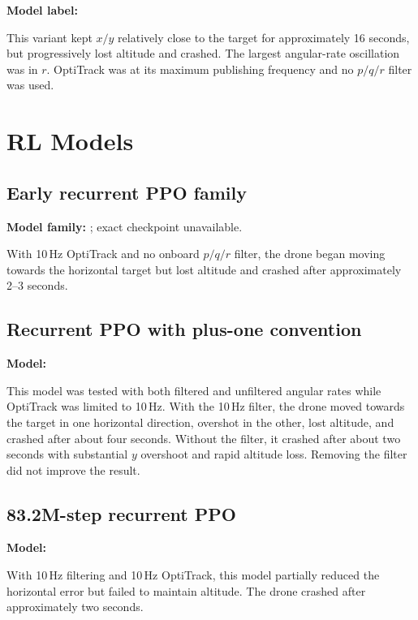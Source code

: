 \documentclass[11pt,a4paper]{article}
\begin{document}
\textbf{Model label:} 

This variant kept $x/y$ relatively close to the target for approximately 16 seconds, but progressively lost altitude and crashed. The largest angular-rate oscillation was in $r$. OptiTrack was at its maximum publishing frequency and no $p/q/r$ filter was used.

\section{RL Models}

\subsection{Early recurrent PPO family}

\textbf{Model family:} ; exact checkpoint unavailable.

With 10\,Hz OptiTrack and no onboard $p/q/r$ filter, the drone began moving towards the horizontal target but lost altitude and crashed after approximately 2--3 seconds.

\subsection{Recurrent PPO with plus-one convention}

\textbf{Model:} 

This model was tested with both filtered and unfiltered angular rates while OptiTrack was limited to 10\,Hz. With the 10\,Hz filter, the drone moved towards the target in one horizontal direction, overshot in the other, lost altitude, and crashed after about four seconds. Without the filter, it crashed after about two seconds with substantial $y$ overshoot and rapid altitude loss. Removing the filter did not improve the result.

\subsection{83.2M-step recurrent PPO}

\textbf{Model:} 

With 10\,Hz filtering and 10\,Hz OptiTrack, this model partially reduced the horizontal error but failed to maintain altitude. The drone crashed after approximately two seconds.
\end{document}

